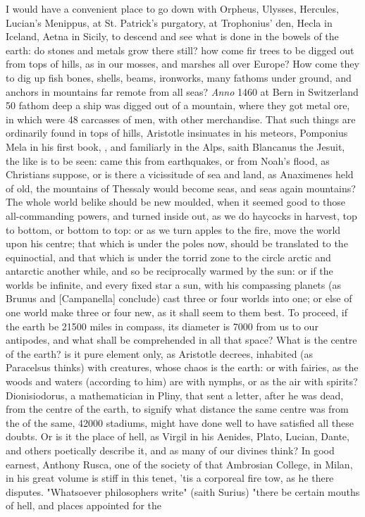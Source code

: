 {I would have a convenient place to go down with Orpheus, Ulysses, Hercules, Lucian's Menippus, at St. Patrick's purgatory, at Trophonius' den, Hecla in Iceland, Aetna in Sicily, to descend and see what is done in the bowels of the earth: do stones and metals grow there still? how come fir trees to be digged out from tops of hills, as in our mosses, and marshes all over Europe? How come they to dig up fish bones, shells, beams, ironworks, many fathoms under ground, and anchors in mountains far remote from all seas? \emph{Anno} 1460 at Bern in Switzerland 50 fathom deep a ship was digged out of a mountain, where they got metal ore, in which were 48 carcasses of men, with other merchandise. That such things are ordinarily found in tops of hills, Aristotle insinuates in his meteors, Pomponius Mela in his first book, , and familiarly in the Alps, saith Blancanus the Jesuit, the like is to be seen: came this from earthquakes, or from Noah's flood, as Christians suppose, or is there a vicissitude of sea and land, as Anaximenes held of old, the mountains of Thessaly would become seas, and seas again mountains? The whole world belike should be new moulded, when it seemed good to those all-commanding powers, and turned inside out, as we do haycocks in harvest, top to bottom, or bottom to top: or as we turn apples to the fire, move the world upon his centre; that which is under the poles now, should be translated to the equinoctial, and that which is under the torrid zone to the circle arctic and antarctic another while, and so be reciprocally warmed by the sun: or if the worlds be infinite, and every fixed star a sun, with his compassing planets (as Brunus and [Campanella] conclude) cast three or four worlds into one; or else of one world make three or four new, as it shall seem to them best. To proceed, if the earth be 21\thinspace{}500 miles in compass, its diameter is 7\thinspace{}000 from us to our antipodes, and what shall be comprehended in all that space? What is the centre of the earth? is it pure element only, as Aristotle decrees, inhabited (as Paracelsus thinks) with creatures, whose chaos is the earth: or with fairies, as the woods and waters (according to him) are with nymphs, or as the air with spirits? Dionisiodorus, a mathematician in Pliny, that sent a letter,  after he was dead, from the centre of the earth, to signify what distance the same centre was from the  of the same,  42\thinspace{}000 stadiums, might have done well to have satisfied all these doubts. Or is it the place of hell, as Virgil in his Aenides, Plato, Lucian, Dante, and others poetically describe it, and as many of our divines think? In good earnest, Anthony Rusca, one of the society of that Ambrosian College, in Milan, in his great volume  is stiff in this tenet, 'tis a corporeal fire tow,  as he there disputes. "Whatsoever philosophers write" (saith Surius) "there be certain mouths of hell, and places appointed for the }
